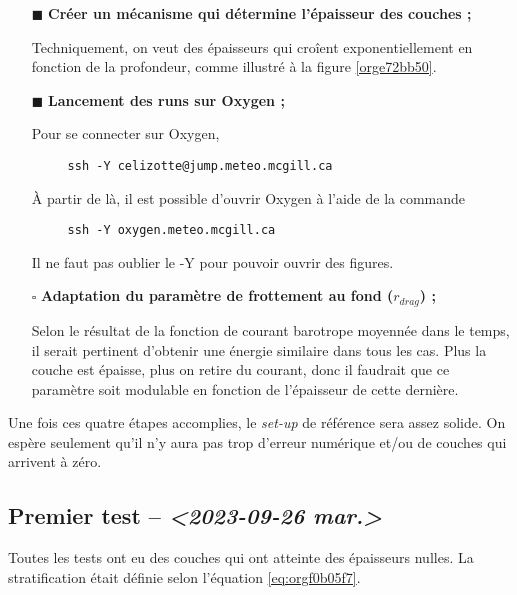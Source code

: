 \documentclass[10pt]{article}
\numberwithin{equation}{section}
\renewcommand{\boxtimes}{\blacksquare}
\begin{document}
\begin{itemize}
\item[{$\boxtimes$}] \textbf{Créer un mécanisme qui détermine l'épaisseur des couches ;}

Techniquement, on veut des épaisseurs qui croîent exponentiellement en fonction de la profondeur, comme illustré à la figure \ref{orge72bb50}.
\end{itemize}


\begin{itemize}
\item[{$\boxtimes$}] \textbf{Lancement des runs sur Oxygen ;}

Pour se connecter sur Oxygen,
\begin{verbatim}
     ssh -Y celizotte@jump.meteo.mcgill.ca
\end{verbatim}
À partir de là, il est possible d'ouvrir Oxygen à l'aide de la commande
\begin{verbatim}
     ssh -Y oxygen.meteo.mcgill.ca
\end{verbatim}
Il ne faut pas oublier le -Y pour pouvoir ouvrir des figures.

\item[{$\square$}] \textbf{Adaptation du paramètre de frottement au fond (\(r_{drag}\)) ;}

Selon le résultat de la fonction de courant barotrope moyennée dans le temps, il serait pertinent d'obtenir une énergie similaire dans tous les cas.
Plus la couche est épaisse, plus on retire du courant, donc il faudrait que ce paramètre soit modulable en fonction de l'épaisseur de cette dernière.
\end{itemize}

Une fois ces quatre étapes accomplies, le \emph{set-up} de référence sera assez solide.
On espère seulement qu'il n'y aura pas trop d'erreur numérique et/ou de couches qui arrivent à zéro.

\subsection{Premier test -- \textit{<2023-09-26 mar.>}}
\label{sec:org8dca66f}

Toutes les tests ont eu des couches qui ont atteinte des épaisseurs nulles.
La stratification était définie selon l'équation \ref{eq:orgf0b05f7}.
\end{document}
